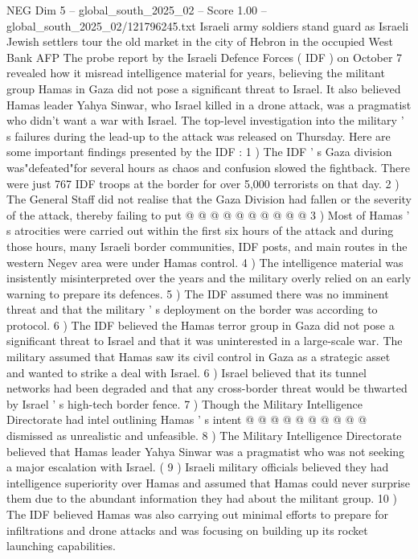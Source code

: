 \begin{textsample}{NEG Dim 5 – global\_south\_2025\_02 – Score 1.00 – global\_south\_2025\_02/121796245.txt}  \label{ex:f5_neg_247}
Israeli army soldiers stand guard as Israeli Jewish settlers tour the old market in the city of Hebron in the occupied West Bank AFP The probe report by the Israeli Defence Forces ( IDF ) on October 7 revealed how it misread intelligence material for years, believing the militant group Hamas in Gaza did not pose a significant threat to Israel.
It also believed Hamas leader Yahya Sinwar, who Israel killed in a drone attack, was a pragmatist who didn't want a war with Israel.
The top-level investigation into the military ' s failures during the lead-up to the attack was released on Thursday.
Here are some important findings presented by the IDF : 1 ) The IDF ' s Gaza division was"defeated"for several hours as chaos and confusion slowed the fightback.
There were just 767 IDF troops at the border for over 5,000 terrorists on that day. 2 ) The General Staff did not realise that the Gaza Division had fallen or the severity of the attack, thereby failing to put @ @ @ @ @ @ @ @ @ @ 3 ) Most of Hamas ' s atrocities were carried out within the first six hours of the attack and during those hours, many Israeli border communities, IDF posts, and main routes in the western Negev area were under Hamas control. 4 ) The intelligence material was insistently misinterpreted over the years and the military overly relied on an early warning to prepare its defences. 5 ) The IDF assumed there was no imminent threat and that the military ' s deployment on the border was according to protocol. 6 ) The IDF believed the Hamas terror group in Gaza did not pose a significant threat to Israel and that it was uninterested in a large-scale war.
The military assumed that Hamas saw its civil control in Gaza as a strategic asset and wanted to strike a deal with Israel. 6 ) Israel believed that its tunnel networks had been degraded and that any cross-border threat would be thwarted by Israel ' s high-tech border fence. 7 ) Though the Military Intelligence Directorate had intel outlining Hamas ' s intent @ @ @ @ @ @ @ @ @ @ dismissed as unrealistic and unfeasible. 8 ) The Military Intelligence Directorate believed that Hamas leader Yahya Sinwar was a pragmatist who was not seeking a major escalation with Israel. ( 9 ) Israeli military officials believed they had intelligence superiority over Hamas and assumed that Hamas could never surprise them due to the abundant information they had about the militant group. 10 ) The IDF believed Hamas was also carrying out minimal efforts to prepare for infiltrations and drone attacks and was focusing on building up its rocket launching capabilities.

\end{textsample}
